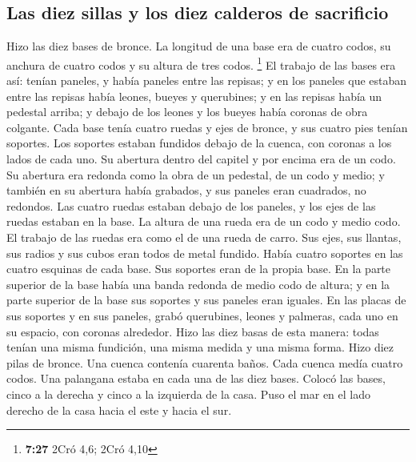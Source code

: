 \begin{paracol}{2}
\hypertarget{las-diez-sillas-y-los-diez-calderos-de-sacrificio}{%
\subsection{Las diez sillas y los diez calderos de
sacrificio}\label{las-diez-sillas-y-los-diez-calderos-de-sacrificio}}

 Hizo las diez bases de bronce. La longitud de una base
era de cuatro codos, su anchura de cuatro codos y su altura de tres
codos. \footnote{\textbf{7:27} 2Cró 4,6; 2Cró 4,10}  El
trabajo de las bases era así: tenían paneles, y había paneles entre las
repisas;  y en los paneles que estaban entre las repisas
había leones, bueyes y querubines; y en las repisas había un pedestal
arriba; y debajo de los leones y los bueyes había coronas de obra
colgante.  Cada base tenía cuatro ruedas y ejes de
bronce, y sus cuatro pies tenían soportes. Los soportes estaban fundidos
debajo de la cuenca, con coronas a los lados de cada uno.
 Su abertura dentro del capitel y por encima era de un
codo. Su abertura era redonda como la obra de un pedestal, de un codo y
medio; y también en su abertura había grabados, y sus paneles eran
cuadrados, no redondos.  Las cuatro ruedas estaban debajo
de los paneles, y los ejes de las ruedas estaban en la base. La altura
de una rueda era de un codo y medio codo.  El trabajo de
las ruedas era como el de una rueda de carro. Sus ejes, sus llantas, sus
radios y sus cubos eran todos de metal fundido.  Había
cuatro soportes en las cuatro esquinas de cada base. Sus soportes eran
de la propia base.  En la parte superior de la base había
una banda redonda de medio codo de altura; y en la parte superior de la
base sus soportes y sus paneles eran iguales.  En las
placas de sus soportes y en sus paneles, grabó querubines, leones y
palmeras, cada uno en su espacio, con coronas alrededor. 
Hizo las diez basas de esta manera: todas tenían una misma fundición,
una misma medida y una misma forma.  Hizo diez pilas de
bronce. Una cuenca contenía cuarenta baños. Cada cuenca medía cuatro
codos. Una palangana estaba en cada una de las diez bases.
 Colocó las bases, cinco a la derecha y cinco a la
izquierda de la casa. Puso el mar en el lado derecho de la casa hacia el
este y hacia el sur.

\hypertarget{otras-herramientas-de-sacrificio-de-minerales-resumen-general}{%
}
\end{paracol}

